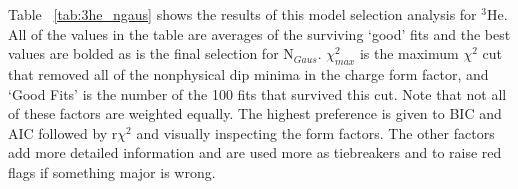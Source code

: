 Table ~\ref{tab:3he_ngaus} shows the results of this model selection analysis for $^3$He. All of the values in the table are averages of the surviving `good' fits and the best values are bolded as is the final selection for N$_{Gaus}$. $\chi^2_{max}$ is the maximum $\chi^2$ cut that removed all of the nonphysical dip minima in the charge form factor, and `Good Fits' is the number of the 100 fits that survived this cut. Note that not all of these factors are weighted equally. The highest preference is given to BIC and AIC followed by r$\chi^2$ and visually inspecting the form factors. The other factors add more detailed information and are used more as tiebreakers and to raise red flags if something major is wrong.


